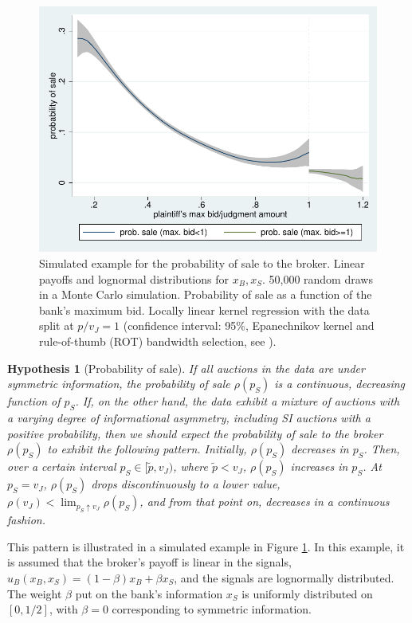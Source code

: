 \documentclass[11pt,twopage]{article}
\newtheorem{conjecture}{Hypothesis}
{\bf}{\it}
\begin{document}
\begin{figure} %
  \centering
  \includegraphics[scale=0.6]{graphics/simulated_simple_discontinuity}
  \caption{Simulated example for the probability of sale to the
    broker. Linear payoffs and lognormal distributions for
    $x_B,x_S$. 50,000 random draws in a Monte Carlo
    simulation. Probability of sale as a function of the bank's
    maximum bid. Locally linear kernel regression with the data split
    at $p/v_J=1$ (confidence interval: 95\%, Epanechnikov kernel and
    rule-of-thumb (ROT) bandwidth selection, see
    \cite{fan1996local}).}
%		
  \label{fig:theory-probability-of-sale_sim}
\end{figure}
\begin{conjecture}[Probability of sale]\label{hyp:discontinuity}
  If all auctions in the data are under symmetric information, the
  probability of sale $\rho(p_S)$ is a continuous, decreasing function
  of $p_S$. If, on the other hand, the data exhibit a mixture of
  auctions with a varying degree of informational asymmetry, including
  SI auctions with a positive probability, then we should expect the
  probability of sale to the broker $\rho(p_S)$ to exhibit the
  following pattern. Initially, $\rho(p_S)$ decreases in $p_S$. Then,
  over a certain interval $p_S \in [\tilde p, v_J)$, where $\tilde p <
  v_J$, $\rho(p_S)$ increases in $p_S$. At $p_S = v_J$, $\rho(p_S)$
  drops discontinuously to a lower value, $\rho(v_J)<\lim_{p_S
    \uparrow v_J} \rho(p_S)$, and from that point on, decreases in a
  continuous fashion.
\end{conjecture}
This pattern is illustrated in a simulated example in Figure
\ref{fig:theory-probability-of-sale_sim}. In this example, it is
assumed that the broker's payoff is linear in the signals,
$u_B(x_B,x_S) = (1-\beta) x_B+\beta x_S$, and the signals are
lognormally distributed. The weight $\beta$ put on the bank's
information $x_S$ is uniformly distributed on $[0,1/2]$, with $\beta =
0$ corresponding to symmetric information.
\end{document}
